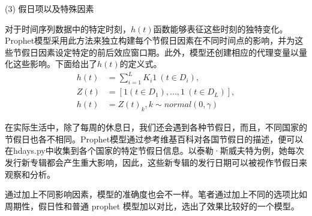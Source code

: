 (3) 假日项以及特殊因素

对于时间序列数据中的特定时刻，$h(t)$函数能够表征这些时刻的独特变化。Prophet模型采用此方法来独立构建每个节假日因素在不同时间点的影响，并为这些节假日因素设定特定的前后效应窗口期。此外，模型还创建相应的代理变量以量化这些影响\cite{JSJA2019S1097}。下面给出了$h(t)$的定义式。
\begin{align}
	h(t) & =\sum_{i=1}^{L}K_{i}1\ (t\in D_{i}),  \\
	Z(t) & =[1(t\in D_{1}),...,1\ (t\in D_{L})], \\
	h(t) & =Z(t)_{k},k\sim normal(0, \gamma)
\end{align}

在实际生活中，除了每周的休息日，我们还会遇到各种节假日，而且，不同国家的节假日也各不相同。Prophet模型通过参考维基百科对各国节假日的描述，便可以在hdays.py中收集到各个国家的特定节假日信息。以泰勒·斯威夫特为例，她每次发行新专辑都会产生重大影响，因此，这些新专辑的发行日期可以被视作节假日来观察和分析。

通过加上不同影响因素，模型的准确度也会不一样。笔者通过加上不同的选项比如周期性，假日性和普通 prophet 模型加以对比，选出了效果比较好的一个模型。

